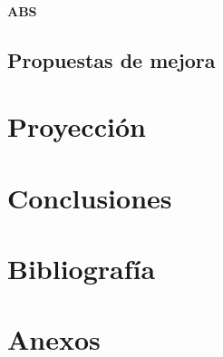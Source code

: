 \documentclass[a4paper,12pt]{article}
\begin{document}
\paragraph{ABS}



\subsection{Propuestas de mejora}



\pagebreak
\section{Proyección}

\pagebreak
\section{Conclusiones}


\pagebreak
\section{Bibliografía}


\pagebreak
\section{Anexos}
\end{document}
